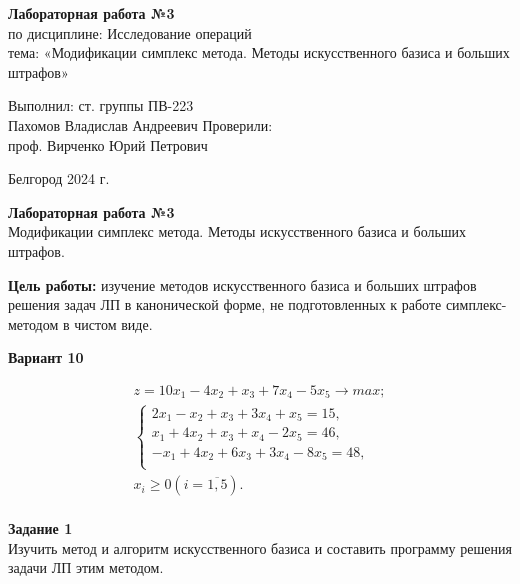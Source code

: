 \documentclass[a4paper,14pt]{extarticle}
\newcommand\textbox[1]{
	\parbox{.45\textwidth}{#1}
}
\begin{document}
\vfill
\begin{center}
    \large{
        \textbf{
            Лабораторная работа №3}}\\
    \normalsize{
        по дисциплине: Исследование операций \\
        тема: «Модификации симплекс метода. Методы искусственного базиса и больших штрафов»}
\end{center}
\vfill
\hfill\textbox{
    Выполнил: ст. группы ПВ-223\\Пахомов Владислав Андреевич
    \bigbreak
    Проверили: \\проф. Вирченко Юрий Петрович
}
\vfill\begin{center}
    Белгород 2024 г.
\end{center}
\newpage
\begin{center}
    \textbf{Лабораторная работа №3}\\
    Модификации симплекс метода. Методы искусственного базиса и больших штрафов.\\
\end{center}
\textbf{Цель работы: }изучение методов искусственного базиса и больших
штрафов решения задач ЛП в канонической форме, не подготовленных
к работе симплекс-методом в чистом виде.\\
\begin{center}
    \textbf{Вариант 10}
\end{center}
\begin{equation*}
    \begin{aligned}
        z = 10x_1 - 4x_2 + x_3 + 7x_4 - 5x_5 \rightarrow max; \\
        \begin{cases}
            2x_1 - x_2 + x_3 + 3x_4 + x_5 = 15,    \\
            x_1 + 4x_2 + x_3 + x_4 - 2x_5 = 46,    \\
            -x_1 + 4x_2 + 6x_3 + 3x_4 - 8x_5 = 48, \\
        \end{cases}                \\
        x_i \geq 0 (i=\overline{1, 5}).
    \end{aligned}
\end{equation*}\\
\textbf{Задание 1}\\
Изучить метод и алгоритм искусственного базиса и составить
программу решения задачи ЛП этим методом.\bigbreak
\end{document}
